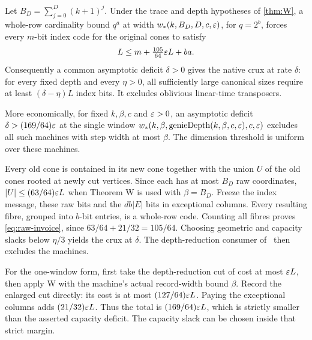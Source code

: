 \begin{corollary}\label{cor:W-obl}
Let $B_D=\sum_{j=0}^D(k+1)^j$. Under the trace and depth hypotheses of \cref{thm:W}, a whole-row cardinality bound
$q^a$ at width $w_*(k,B_D,D,c,\varepsilon)$, for $q=2^b$, forces every $m$-bit index code for the original cones to satisfy
\begin{equation}\label{eq:raw-invoice}
 L\le m+\tfrac{105}{64}\varepsilon L+ba.
\end{equation}
Consequently a common asymptotic deficit $\delta>0$ gives the native crux at rate $\delta$: for every fixed depth
and every $\eta>0$, all sufficiently large canonical sizes require at least $(\delta-\eta)L$ index bits.
It excludes oblivious linear-time transposers.

More economically, for fixed $k,\beta,c$ and $\varepsilon>0$, an asymptotic deficit
$\delta>(169/64)\varepsilon$ at the single window
$w_*(k,\beta,\operatorname{genieDepth}(k,\beta,c,\varepsilon),c,\varepsilon)$ excludes all such machines with step width at most
$\beta$. The dimension threshold is uniform over these machines.
\end{corollary}
\begin{outline}
Every old cone is contained in its new cone together with the union $U$ of the old cones rooted at newly cut
vertices. Since each has at most $B_D$ raw coordinates, $|U|\le(63/64)\varepsilon L$ when Theorem W is used with
$\beta=B_D$. Freeze the index message, these raw bits and the $db|E|$ bits in exceptional columns. Every resulting
fibre, grouped into $b$-bit entries, is a whole-row code. Counting all fibres proves \cref{eq:raw-invoice}, since
$63/64+21/32=105/64$. Choosing geometric and capacity slacks below $\eta/3$ yields the crux at $\delta$.
The depth-reduction consumer of~\cite[Corollary O]{BoundedStack2026} then excludes the machines.

For the one-window form, first take the depth-reduction cut of cost at most $\varepsilon L$, then apply W with the
machine's actual record-width bound $\beta$. Record the enlarged cut directly: its cost is at most
$(127/64)\varepsilon L$. Paying the exceptional columns adds $(21/32)\varepsilon L$. Thus the total is
$(169/64)\varepsilon L$, which is strictly smaller than the asserted capacity deficit. The capacity slack can be chosen
inside that strict margin.
\end{outline}
